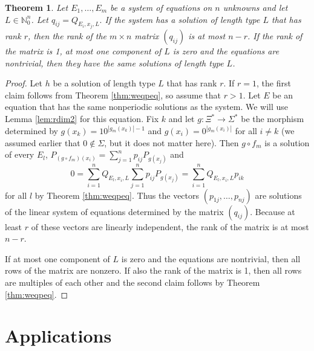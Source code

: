 \documentclass[submission]{eptcs}
\newtheorem{theorem}{Theorem}[section]
\theoremstyle{definition}
\newcommand{\No}{\mathbb N_0}
\newcommand{\px}[1]{ P_{#1} }
\newcommand{\qx}[3]{ Q_{#1,#2,#3} }
\begin{document}
\begin{theorem} \label{thm:rank}
Let $E_1, \dots, E_{m}$ be a system of equations on $n$ unknowns and
let $L \in \No^n$. Let
\begin{math}
    q_{ij} = \qx{E_i}{x_j}{L}.
\end{math}
If the system has a solution of length type $L$ that has rank $r$,
then the rank of the $m \times n$ matrix $(q_{ij})$ is at most
$n-r$. If the rank of the matrix is 1, at most one component of $L$
is zero and the equations are nontrivial, then they have the same
solutions of length type $L$.
\end{theorem}
\begin{proof}
Let $h$ be a solution of length type $L$ that has rank $r$. If
$r=1$, the first claim follows from Theorem \ref{thm:weqpeq}, so
assume that $r > 1$. Let $E$ be an equation that has the same
nonperiodic solutions as the system. We will use Lemma
\ref{lem:rdim2} for this equation. Fix $k$ and let $g: \Xi^* \to
\Sigma^*$ be the morphism determined by
\begin{math}
    g(x_k) = 10^{|g_m(x_k)|-1}
\end{math}
and
\begin{math}
    g(x_i) = 0^{|g_m(x_i)|}
\end{math}
for all $i \ne k$ (we assumed earlier that $0 \notin \Sigma$, but it
does not matter here). Then $g \circ f_m$ is a solution of every
$E_l$,
\begin{math}
    \px{(g \circ f_m)(x_i)} = \sum_{j=1}^n p_{ij} \px{g(x_j)}
\end{math}
and
\begin{equation*}
    0 = \sum_{i=1}^n \qx{E_l}{x_i}{L} \sum_{j=1}^n p_{ij} \px{g(x_j)}
    = \sum_{i=1}^n \qx{E_l}{x_i}{L} p_{ik}
\end{equation*}
for all $l$ by Theorem \ref{thm:weqpeq}. Thus the vectors $(p_{1j},
\dots, p_{nj})$ are solutions of the linear system of equations
determined by the matrix $(q_{ij})$. Because at least $r$ of these
vectors are linearly independent, the rank of the matrix is at most
$n-r$.

If at most one component of $L$ is zero and the equations are
nontrivial, then all rows of the matrix are nonzero. If also the
rank of the matrix is 1, then all rows are multiples of each other
and the second claim follows by Theorem \ref{thm:weqpeq}.
\end{proof}

\section{Applications} \label{sect:appl}
\end{document}
